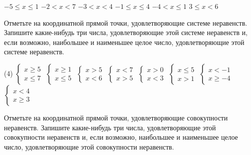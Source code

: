 \begin{class}[number=1-2]
\begin{listofex}
\begin{tasks}
			\task \( -5 \le x \le 1 \)
			\task \( -2 < x < 7 \)
			\task \( -3 < x < 4 \)
			\task \( -1 \le x \le 4 \)
			\task \( -4 < x \le 1 \)
			\task \( 3 \le x < 6 \)
		\end{tasks}
		\item Отметьте на координатной прямой точки, удовлетворяющие системе неравенств. Запишите какие-нибудь три числа, удовлетворяющие этой системе неравенств и, если возможно, наибольшее и наименьшее целое число, удовлетворяющие этой системе неравенств.
		\begin{tasks}(4)
			\task \( \begin{cases} x \ge 5 \\ x \le 7 \end{cases} \)
			\task \( \begin{cases} x \ge 1 \\ x \le 5 \end{cases} \)
			\task \( \begin{cases} x>5 \\ x<6 \end{cases} \)
			\task \( \begin{cases} x<7 \\ x>5 \end{cases} \)
			\task \( \begin{cases} x>0 \\ x<3 \end{cases} \)
			\task \( \begin{cases} x\le5 \\ x>1 \end{cases} \)
			\task \( \begin{cases} x<-1 \\ x\ge-4 \end{cases} \)
			\task \( \begin{cases} x<4 \\ x\ge3 \end{cases} \)
		\end{tasks}
		\item Отметьте на координатной прямой точки, удовлетворяющие совокупности неравенств. Запишите какие-нибудь три числа, удовлетворяющие этой совокупности неравенств и, если возможно, наибольшее и наименьшее целое число, удовлетворяющие этой совокупности неравенств.

\end{listofex}
\end{class}
